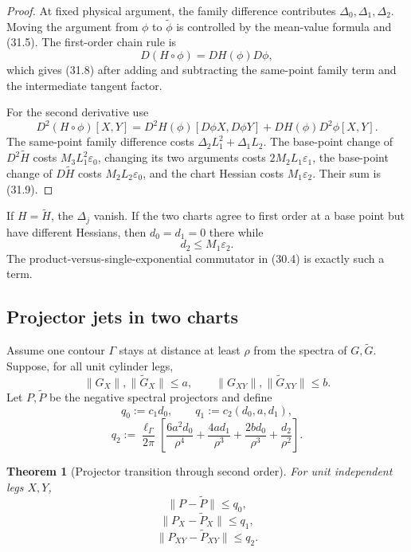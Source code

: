 \documentclass[11pt]{article}
\newtheorem{theorem}{Theorem}[section]
\begin{document}
\begin{proof}
At fixed physical argument, the family difference contributes
\(\Delta_0,\Delta_1,\Delta_2\).  Moving the argument from \(\phi\) to
\(\widetilde\phi\) is controlled by the mean-value formula and
(31.5).  The first-order chain rule is
\[
 D(H\circ\phi)=DH(\phi)D\phi,
\]
which gives (31.8) after adding and subtracting the same-point family
term and the intermediate tangent factor.

For the second derivative use
\[
 D^2(H\circ\phi)[X,Y]
 =
 D^2H(\phi)[D\phi X,D\phi Y]
 +DH(\phi)D^2\phi[X,Y].
 \tag{31.10}
\]
The same-point family difference costs
\(\Delta_2L_1^2+\Delta_1L_2\).  The base-point change of
\(D^2\widetilde H\) costs \(M_3L_1^2\varepsilon_0\), changing its two
arguments costs \(2M_2L_1\varepsilon_1\), the base-point change of
\(D\widetilde H\) costs \(M_2L_2\varepsilon_0\), and the chart Hessian
costs \(M_1\varepsilon_2\).  Their sum is (31.9).
\end{proof}

If \(H=\widetilde H\), the \(\Delta_j\) vanish.  If the two charts agree
to first order at a base point but have different Hessians, then
\(d_0=d_1=0\) there while
\[
 d_2\leq M_1\varepsilon_2.
 \tag{31.11}
\]
The product-versus-single-exponential commutator in (30.4) is exactly
such a term.

\subsection{Projector jets in two charts}

Assume one contour \(\Gamma\) stays at distance at least \(\rho\) from
the spectra of \(G,\widetilde G\).  Suppose, for all unit cylinder legs,
\[
 \|G_X\|,\|\widetilde G_X\|\leq a,\qquad
 \|G_{XY}\|,\|\widetilde G_{XY}\|\leq b.
 \tag{31.12}
\]
Let \(P,\widetilde P\) be the negative spectral projectors and define
\[
 q_0:=c_1d_0,
 \qquad
 q_1:=c_2(d_0,a,d_1),
 \tag{31.13}
\]
\[
 q_2:=
 \frac{\ell_\Gamma}{2\pi}
 \left[
 \frac{6a^2d_0}{\rho^4}
 +\frac{4ad_1}{\rho^3}
 +\frac{2bd_0}{\rho^3}
 +\frac{d_2}{\rho^2}
 \right].
 \tag{31.14}
\]

\begin{theorem}[Projector transition through second order]
\label{thm:v11v31-projector-transition}
For unit independent legs \(X,Y\),
\[
 \|P-\widetilde P\|\leq q_0,
 \tag{31.15}
\]
\[
 \|P_X-\widetilde P_X\|\leq q_1,
 \tag{31.16}
\]
\[
 \|P_{XY}-\widetilde P_{XY}\|\leq q_2.
 \tag{31.17}
\]
\end{theorem}
\end{document}
